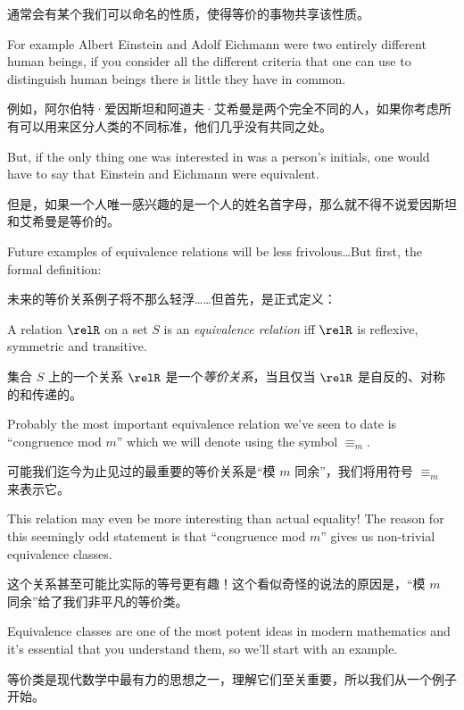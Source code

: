 通常会有某个我们可以命名的性质，使得等价的事物共享该性质。

For 
example Albert Einstein and Adolf Eichmann were two entirely
different human beings, if you consider all the different criteria
that one can use to distinguish human beings there is little they
have in common.

例如，阿尔伯特·爱因斯坦和阿道夫·艾希曼是两个完全不同的人，如果你考虑所有可以用来区分人类的不同标准，他们几乎没有共同之处。

But, if the only thing one was interested in was
a person's initials, one would have to say that Einstein and Eichmann
were equivalent.

但是，如果一个人唯一感兴趣的是一个人的姓名首字母，那么就不得不说爱因斯坦和艾希曼是等价的。

Future examples of equivalence relations will
be less frivolous\ldots  But first, the formal definition:

未来的等价关系例子将不那么轻浮……但首先，是正式定义：

\begin{defi} A relation $\relR$ on a set $S$ is an \emph{equivalence relation}
iff $\relR$ is reflexive, symmetric and transitive.
\end{defi}

\begin{defi} 集合 $S$ 上的一个关系 $\relR$ 是一个\emph{等价关系}，当且仅当 $\relR$ 是自反的、对称的和传递的。
\end{defi}

Probably the most important equivalence relation we've seen to date
is ``congruence mod $m$'' which we will denote using the symbol $\equiv_m$.

可能我们迄今为止见过的最重要的等价关系是“模 $m$ 同余”，我们将用符号 $\equiv_m$ 来表示它。

This relation may even be more interesting than
actual equality!   The reason for this seemingly odd statement is that
``congruence mod $m$'' gives us non-trivial  equivalence classes.

这个关系甚至可能比实际的等号更有趣！这个看似奇怪的说法的原因是，“模 $m$ 同余”给了我们非平凡的等价类。

Equivalence
classes are one of the most potent ideas in modern mathematics and it's essential
that you understand them, so we'll start with an example.

等价类是现代数学中最有力的思想之一，理解它们至关重要，所以我们从一个例子开始。

